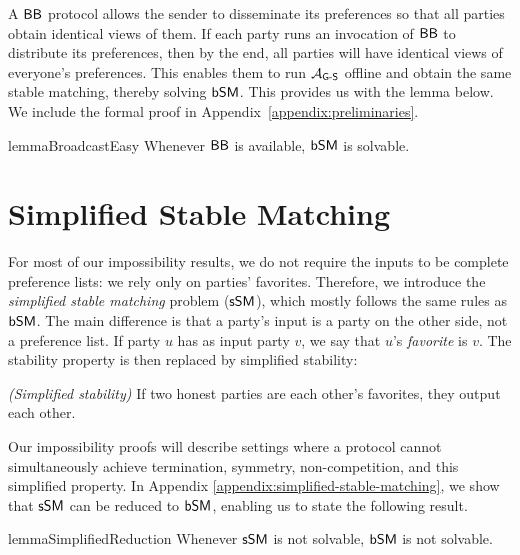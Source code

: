 A $\textsf{BB}$ protocol allows the sender to disseminate its preferences so that all parties obtain identical views of them. If each party runs an invocation of $\textsf{BB}$ to distribute its preferences, then by the end, all parties will have identical views of everyone's preferences. This enables them to run $\mathcal{A}_\textsf{G-S}$ offline and obtain the same stable matching, thereby solving $\textsf{bSM}$. 
This provides us with the lemma below. We include the formal proof in Appendix~\ref{appendix:preliminaries}.

\begin{restatable}{lemma}{BroadcastEasy} \label{lemma:broadcast-easy}
Whenever $\textsf{BB}$ is available, $\textsf{bSM}$ is solvable.
\end{restatable}

\section{Simplified Stable Matching}
For most of our impossibility results, we do not require the inputs to be complete preference lists: we rely only on parties' favorites. Therefore, we introduce the \emph{simplified stable matching} problem ($\textsf{sSM}$), which mostly follows the same rules as $\textsf{bSM}$. The main difference is that a party's input is a party on the other side, not a preference list. If party $u$ has as input party $v$, we say that $u$'s \emph{favorite} is $v$. The stability property is then replaced by simplified stability:

\vspace{.1cm}
\noindent \emph{(Simplified stability)} If two honest parties are each other's favorites, they output each other.
\vspace{.1cm}

Our impossibility proofs will describe settings where a protocol cannot simultaneously achieve termination, symmetry, non-competition, and this simplified property. In Appendix \ref{appendix:simplified-stable-matching}, we show that $\textsf{sSM}$ can be reduced to $\textsf{bSM}$, enabling us to state the following result.


\begin{restatable}{lemma}{SimplifiedReduction} \label{coro:to-simplified}
Whenever $\textsf{sSM}$ is not solvable, $\textsf{bSM}$ is not solvable.
\end{restatable}

